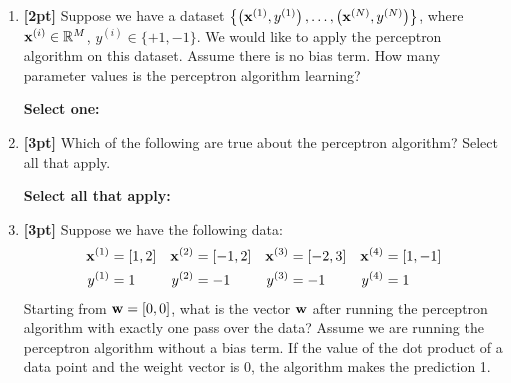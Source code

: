 \documentclass[12pt]{article}
\renewcommand{\circle}{\tikz\draw[black] (0,0) circle (1ex);}
\begin{document}
\begin{enumerate}
    
    
    \clearpage
    
    \item \textbf{[2pt]} Suppose we have a dataset $\left\{ \left(\mathbf{x}^{(1)},y^{(1)}\right),\ldots, \left(\mathbf{x}^{(N)},y^{(N)}\right) \right\}$, where $\mathbf{x}^{(i)} \in \mathbb{R}^M$, $y^{(i)}\in\{+1,-1\}$. We would like to apply the perceptron algorithm on this dataset. Assume there is no bias term. How many parameter values is the perceptron algorithm learning?

    \textbf{Select one:}


    
    \item \textbf{[3pt]} Which of the following are true about the perceptron algorithm? Select all that apply.

    \textbf{Select all that apply:}

    
    
    \item \textbf{[3pt]} Suppose we have the following data:     \begin{align*}
        \mathbf{x}^{(1)} &= [1,2] & \mathbf{x}^{(2)} &= [-1,2] & \mathbf{x}^{(3)} &= [-2,3] & \mathbf{x}^{(4)} &= [1,-1] \\
        y^{(1)} &= 1 & y^{(2)} &= -1 & y^{(3)} &= -1 & y^{(4)} &= 1
    \end{align*}
    Starting from $\mathbf{w} = [0,0]$, what is the vector $\mathbf{w}$ after running the perceptron algorithm with exactly one pass over the data? Assume we are running the perceptron algorithm without a bias term. If the value of the dot product of a data point and the weight vector is $0$, the algorithm makes the prediction 1.


\end{enumerate}
\end{document}
